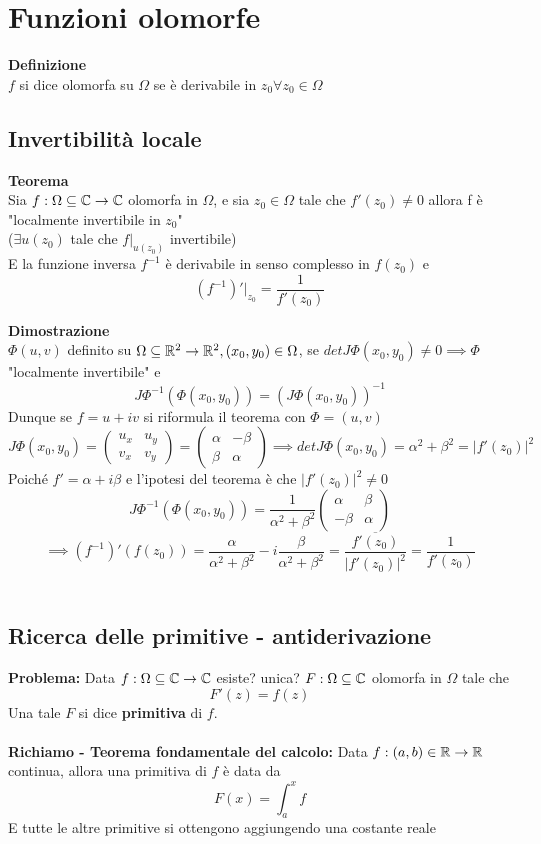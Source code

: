
\section{Funzioni olomorfe}
\begin{tcolorbox}
	\textbf{Definizione} \\
	$f$ si dice olomorfa su $\Omega$ se è derivabile in $z_0\forall z_0\in\Omega$
\end{tcolorbox}
\subsection{Invertibilità locale}
\begin{tcolorbox}
\textbf{Teorema}
\\Sia $f:\Omega \subseteq\mathbb{C}\to \mathbb{C}$ olomorfa in $\Omega$, e sia $z_0\in\Omega$ tale che $f'(z_0)\ne0$ allora f è "localmente invertibile in $z_0$"\\
($\exists u(z_0)$ tale che $f|_{u(z_0)}$ invertibile)
\\E la funzione inversa $f^{-1}$ è derivabile in senso complesso in $f(z_0)$ e 
\[(f^{-1})'|_{z_0}=\frac{1}{f'(z_0)}\]	
\end{tcolorbox}
\textbf{Dimostrazione}\\
$\Phi(u,v)$ definito su $\Omega \subseteq \mathbb{R}^2\to \mathbb{R}^2, (x_0,y_0)\in\Omega$, se $detJ\Phi(x_0,y_0)\ne 0\implies\Phi$ "localmente invertibile" e 
\[J\Phi^{-1}(\Phi(x_0,y_0))=(J\Phi(x_0,y_0))^{-1}\]
Dunque se $f=u+iv$ si riformula il teorema con $\Phi=(u,v)$
\[J\Phi(x_0,y_0)=\begin{pmatrix}
	u_x&u_y\\v_x & v_y
\end{pmatrix}
=\begin{pmatrix}
	\alpha & -\beta \\ \beta & \alpha
\end{pmatrix}
\implies detJ\Phi(x_0,y_0)=\alpha^2+\beta^2=|f'(z_0)|^{2}
\]
Poiché $f'=\alpha +i\beta$ e l'ipotesi del teorema è che $|f'(z_0)|^2\ne 0$
\[J\Phi^{-1}(\Phi(x_0,y_0))=\frac{1}{\alpha^2+\beta^2}\begin{pmatrix}
	\alpha&\beta\\-\beta &\alpha
\end{pmatrix}
\]
\[\implies(f^{-1})'(f(z_0))=\frac{\alpha}{\alpha^2+\beta^2}-i\frac{\beta}{\alpha^2+\beta^2}= \frac{\overline{f'(z_0)}}{|f'(z_0)|^2}=\frac{1}{f'(z_0)}\]
\\
\subsection{Ricerca delle primitive - antiderivazione}
\textbf{Problema: }Data $f:\Omega \subseteq \mathbb{C}\to \mathbb{C}$ esiste? unica? $F:\Omega\subseteq\mathbb{C}$ olomorfa in $\Omega$ tale che \[F'(z)=f(z)\]
Una tale $F$ si dice \textbf{primitiva} di $f$.\\
\\\textbf{Richiamo - Teorema fondamentale del calcolo: }Data $f:(a,b)\in\mathbb{R}\to \mathbb{R}$ continua, allora una primitiva di $f$ è data da \[F(x)=\int_{a}^{x} f\]
E tutte le altre primitive si ottengono aggiungendo una costante reale

